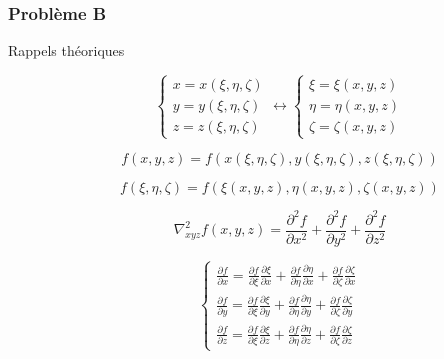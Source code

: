 \documentclass
[
a4paper,                      %
twoside,					  %
12pt,                         %
abstract,		      %
fleqn,                        %
]
{scrartcl} %
\begin{document}
\newpage

\subsubsection{Probl\`eme B}

\begin{description}

\item[Rappels th\'eoriques]

\begin{equation}
\begin{cases}
x=x\left(\xi,\eta,\zeta\right)\\
y=y\left(\xi,\eta,\zeta\right)\\
z=z\left(\xi,\eta,\zeta\right)
\end{cases}\longleftrightarrow\begin{cases}
\xi=\xi\left(x,y,z\right)\\
\eta=\eta\left(x,y,z\right)\\
\zeta=\zeta\left(x,y,z\right)
\end{cases}
\end{equation}

\begin{equation}
f\left(x,y,z\right)=f\left(x\left(\xi,\eta,\zeta\right),y\left(\xi,\eta,\zeta\right),z\left(\xi,\eta,\zeta\right)\right)
\end{equation}

\begin{equation}
f\left(\xi,\eta,\zeta\right)=f\left(\xi\left(x,y,z\right),\eta\left(x,y,z\right),\zeta\left(x,y,z\right)\right)
\end{equation}

\begin{equation}
\nabla_{xyz}^{2}f\left(x,y,z\right)=\frac{\partial^{2} f}{\partial x^{2}}+\frac{\partial^{2} f}{\partial y^{2}}+\frac{\partial^{2} f}{\partial z^{2}}
\end{equation}

\begin{equation}
\begin{cases}
\frac{\partial f}{\partial x}=\frac{\partial f}{\partial\xi}\frac{\partial\xi}{\partial x}+\frac{\partial f}{\partial\eta}\frac{\partial\eta}{\partial x}+\frac{\partial f}{\partial\zeta}\frac{\partial\zeta}{\partial x}\\[5pt]
\frac{\partial f}{\partial y}=\frac{\partial f}{\partial\xi}\frac{\partial\xi}{\partial y}+\frac{\partial f}{\partial\eta}\frac{\partial\eta}{\partial y}+\frac{\partial f}{\partial\zeta}\frac{\partial\zeta}{\partial y}\\[5pt]
\frac{\partial f}{\partial z}=\frac{\partial f}{\partial\xi}\frac{\partial\xi}{\partial z}+\frac{\partial f}{\partial\eta}\frac{\partial\eta}{\partial z}+\frac{\partial f}{\partial\zeta}\frac{\partial\zeta}{\partial z}
\end{cases}
\end{equation}


\end{description}
\end{document}
